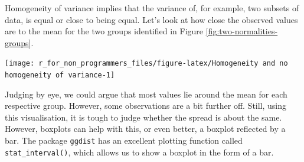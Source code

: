 \documentclass[
]{book}
\newenvironment{Shaded}{\begin{snugshade}}{\end{snugshade}}
\newcommand{\AttributeTok}[1]{\textcolor[rgb]{0.77,0.63,0.00}{#1}}
\newcommand{\DecValTok}[1]{\textcolor[rgb]{0.00,0.00,0.81}{#1}}
\newcommand{\FloatTok}[1]{\textcolor[rgb]{0.00,0.00,0.81}{#1}}
\newcommand{\FunctionTok}[1]{\textcolor[rgb]{0.00,0.00,0.00}{#1}}
\newcommand{\NormalTok}[1]{#1}
\newcommand{\SpecialCharTok}[1]{\textcolor[rgb]{0.00,0.00,0.00}{#1}}
\newcommand{\StringTok}[1]{\textcolor[rgb]{0.31,0.60,0.02}{#1}}
\begin{document}
Homogeneity of variance implies that the variance of, for example, two subsets of data, is equal or close to being equal. Let's look at how close the observed values are to the mean for the two groups identified in Figure \ref{fig:two-normalities-groups}.

\begin{Shaded}
\end{Shaded}

\begin{center}\texttt{[image: r\_for\_non\_programmers\_files/figure-latex/Homogeneity and no homogeneity of variance-1]} \end{center}

Judging by eye, we could argue that most values lie around the mean for each respective group. However, some observations are a bit further off. Still, using this visualisation, it is tough to judge whether the spread is about the same. However, boxplots can help with this, or even better, a boxplot reflected by a bar. The package \texttt{ggdist} has an excellent plotting function called \texttt{stat\_interval()}, which allows us to show a boxplot in the form of a bar.
\end{document}

